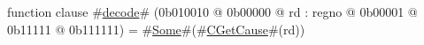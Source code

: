function clause #\hyperref[zdecode]{decode}# (0b010010 @ 0b00000 @ rd : regno @    0b00001 @    0b11111 @ 0b111111) = #\hyperref[zSome]{Some}#(#\hyperref[zCGetCause]{CGetCause}#(rd))
